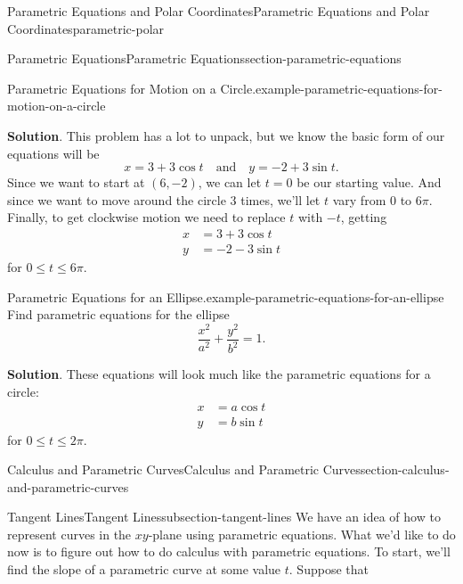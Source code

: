 \documentclass[oneside,10pt,]{book}
\numberwithin{equation}{section}
\newcommand{\qq}[1]{\quad\text{#1}\quad}
\newcommand{\amp}{&}
\begin{document}
\begin{chapterptx}{Parametric Equations and Polar Coordinates}{}{Parametric Equations and Polar Coordinates}{}{}{parametric-polar}
\begin{sectionptx}{Parametric Equations}{}{Parametric Equations}{}{}{section-parametric-equations}
\begin{example}{Parametric Equations for Motion on a Circle.}{example-parametric-equations-for-motion-on-a-circle}
\par\smallskip%
\noindent\textbf{Solution}.\hypertarget{solution-201}{}\quad%
\hypertarget{p-1001}{}%
This problem has a lot to unpack, but we know the basic form of our equations will be%
\begin{equation*}
x = 3 + 3\cos t\qq{and} y = -2 + 3\sin t\text{.}
\end{equation*}
Since we want to start at \((6,-2)\), we can let \(t = 0\) be our starting value. And since we want to move around the circle \(3\) times, we'll let \(t\) vary from \(0\) to \(6\pi\). Finally, to get clockwise motion we need to replace \(t\) with \(-t\), getting%
\begin{align*}
x \amp = 3 + 3\cos t \\
y \amp = -2 - 3\sin t 
\end{align*}
for \(0\leq t\leq 6\pi\).%
\end{example}
\begin{example}{Parametric Equations for an Ellipse.}{example-parametric-equations-for-an-ellipse}%
\hypertarget{p-1002}{}%
Find parametric equations for the ellipse%
\begin{equation*}
\frac{x^{2}}{a^{2}} + \frac{y^{2}}{b^{2}} = 1\text{.}
\end{equation*}
%
\par\smallskip%
\noindent\textbf{Solution}.\hypertarget{solution-202}{}\quad%
\hypertarget{p-1003}{}%
These equations will look much like the parametric equations for a circle:%
\begin{align*}
x \amp = a\cos t \\
y \amp = b\sin t 
\end{align*}
for \(0\leq t\leq 2\pi\).%
\end{example}
\end{sectionptx}
%
%
\typeout{************************************************}
\typeout{************************************************}
%
\begin{sectionptx}{Calculus and Parametric Curves}{}{Calculus and Parametric Curves}{}{}{section-calculus-and-parametric-curves}
%
%
\typeout{************************************************}
\typeout{************************************************}
%
\begin{subsectionptx}{Tangent Lines}{}{Tangent Lines}{}{}{subsection-tangent-lines}
\hypertarget{p-1004}{}%
We have an idea of how to represent curves in the \(xy\)-plane using parametric equations. What we'd like to do now is to figure out how to do calculus with parametric equations. To start, we'll find the slope of a parametric curve at some value \(t\). Suppose that%

\end{subsectionptx}
\end{sectionptx}
\end{chapterptx}
\end{document}
